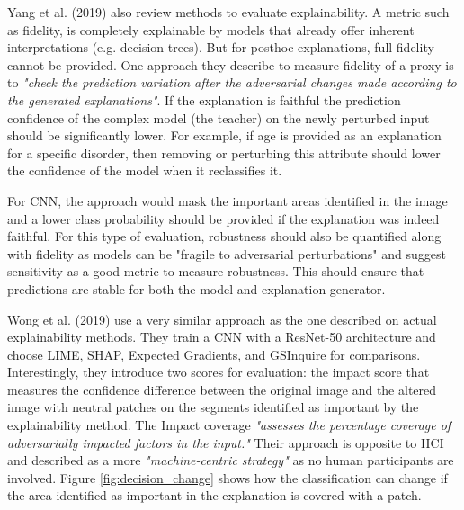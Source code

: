 \documentclass[proposal]{softeng}
\begin{document}
Yang et al. (2019) \cite{YangFan2019EEWG} also review methods to evaluate explainability. A metric such as fidelity, is completely explainable by models that already offer inherent interpretations (e.g. decision trees). But for posthoc explanations, full fidelity cannot be provided. One approach they describe to measure fidelity of a proxy is to \textit{"check the prediction variation after the adversarial changes made according to the generated explanations"}. If the explanation is faithful the prediction confidence of the complex model (the teacher) on the newly perturbed input should be significantly lower. For example, if age is provided as an explanation for a specific disorder, then removing or perturbing this attribute should lower the confidence of the model when it reclassifies it. 

For CNN, the approach would mask the important areas identified in the image and a lower class probability should be provided if the explanation was indeed faithful. For this type of evaluation, robustness should also be quantified along with fidelity as models can be "fragile to adversarial perturbations" and suggest sensitivity as a good metric to measure robustness. This should ensure that predictions are stable for both the model and explanation generator.

Wong et al. (2019) \cite{LinZhongQiu2019DERD} use a very similar approach as the one described on actual explainability methods. They train a CNN with a ResNet-50 architecture and choose LIME, SHAP, Expected Gradients, and GSInquire for comparisons. Interestingly, they introduce two scores for evaluation: the impact score that measures the confidence difference between the original image and the altered image with neutral patches on the segments identified as important by the explainability method. The Impact coverage \textit{"assesses the percentage coverage of adversarially impacted factors in the input."} Their approach is opposite to HCI and described as a more \textit{"machine-centric strategy"} as no human participants are involved. Figure \ref{fig:decision_change} shows how the classification can change if the area identified as important in the explanation is covered with a patch.
\end{document}

